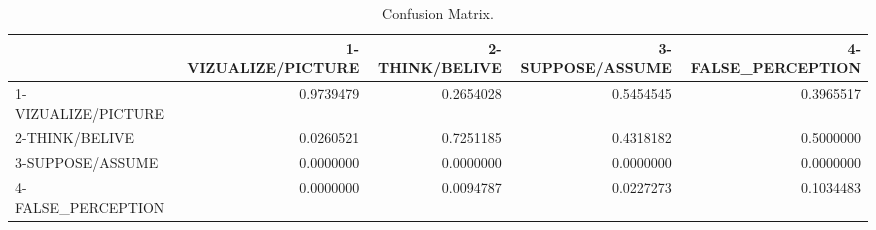 \documentclass[
]{article}
\begin{document}
\begin{landscape}\begin{table}[H]
\centering
\caption{\label{tab:unnamed-chunk-15}Confusion Matrix.\label{tab:cm}}
\centering
\fontsize{8}{10}\selectfont
\begin{tabular}[t]{lrrrr}
\toprule
  & 1-VIZUALIZE/PICTURE & 2-THINK/BELIVE & 3-SUPPOSE/ASSUME & 4-FALSE\_PERCEPTION\\
\midrule
1-VIZUALIZE/PICTURE & 0.9739479 & 0.2654028 & 0.5454545 & 0.3965517\\
2-THINK/BELIVE & 0.0260521 & 0.7251185 & 0.4318182 & 0.5000000\\
3-SUPPOSE/ASSUME & 0.0000000 & 0.0000000 & 0.0000000 & 0.0000000\\
4-FALSE\_PERCEPTION & 0.0000000 & 0.0094787 & 0.0227273 & 0.1034483\\
\bottomrule
\end{tabular}
\end{table}
\end{landscape}

  
\end{document}
